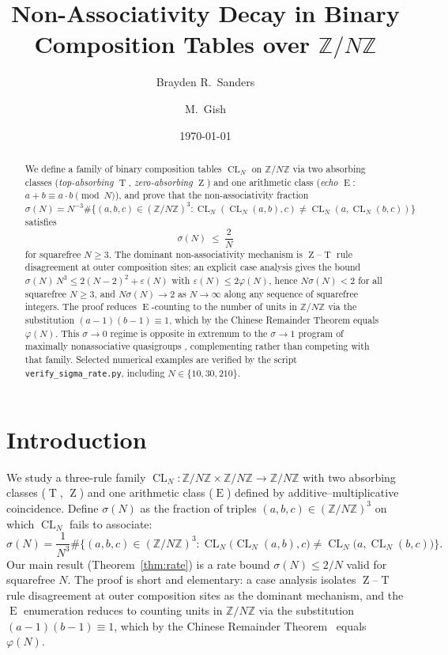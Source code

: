 \documentclass[11pt,reqno]{amsart}
\title[Non-associativity decay on \texorpdfstring{$\mathbb{Z}/N\mathbb{Z}$}{Z/NZ}]%
{Non-Associativity Decay in Binary Composition Tables over
$\mathbb{Z}/N\mathbb{Z}$}
\author{Brayden R.\ Sanders}
\author{M.\ Gish}
\date{\today}
\theoremstyle{plain}
\theoremstyle{definition}
\theoremstyle{remark}
\DeclareMathOperator{\CL}{CL}
\DeclareMathOperator{\ECHO}{E}
\DeclareMathOperator{\HARM}{T}
\DeclareMathOperator{\VOID}{Z}
\newcommand{\ZN}{\mathbb{Z}/N\mathbb{Z}}
\begin{document}
\begin{abstract}
We define a family of binary composition tables $\CL_N$ on $\ZN$ via
two absorbing classes (\emph{top-absorbing} $\HARM$, \emph{zero-absorbing}
$\VOID$) and one arithmetic class (\emph{echo} $\ECHO$: $a+b\equiv a\cdot b\pmod N$),
and prove that the non-associativity fraction
$\sigma(N)=N^{-3}\#\{(a,b,c)\in(\ZN)^{3}:\CL_N(\CL_N(a,b),c)\neq\CL_N(a,\CL_N(b,c))\}$
satisfies
\[
  \sigma(N)\;\le\;\frac{2}{N}
\]
for squarefree $N\ge 3$. The dominant non-associativity mechanism is
$\VOID$--$\HARM$ rule disagreement at outer composition sites; an
explicit case analysis gives the bound
$\sigma(N)\,N^{3}\le 2(N-2)^{2}+\varepsilon(N)$ with
$\varepsilon(N)\le 2\varphi(N)$, hence $N\sigma(N)<2$ for all
squarefree $N\ge 3$, and $N\sigma(N)\to 2$ as $N\to\infty$ along
any sequence of squarefree integers. The proof reduces $\ECHO$-counting to
the number of units in $\ZN$ via the substitution
$(a-1)(b-1)\equiv 1$, which by the Chinese Remainder Theorem equals
$\varphi(N)$. This $\sigma\to 0$ regime is opposite in extremum to
the $\sigma\to 1$ program of maximally nonassociative quasigroups
\cite{DrapalWanless2021,DrapalLisonek2020}, complementing rather than
competing with that family. Selected numerical examples
are verified by the script \texttt{verify\_sigma\_rate.py}, including
$N\in\{10,30,210\}$.
\end{abstract}

\maketitle

\section{Introduction}\label{sec:intro}

We study a three-rule family $\CL_N:\ZN\times\ZN\to\ZN$ with two
absorbing classes ($\HARM$, $\VOID$) and one arithmetic class
($\ECHO$) defined by additive--multiplicative coincidence. Define
$\sigma(N)$ as the fraction of triples $(a,b,c)\in(\ZN)^3$ on which
$\CL_N$ fails to associate:
\begin{equation}\label{eq:sigma-def}
  \sigma(N)=\frac{1}{N^{3}}
  \#\Big\{(a,b,c)\in(\ZN)^{3}:
         \CL_N\!\big(\CL_N(a,b),c\big)\neq\CL_N\!\big(a,\CL_N(b,c)\big)\Big\}.
\end{equation}
Our main result (Theorem~\ref{thm:rate}) is a rate bound
$\sigma(N)\le 2/N$ valid for squarefree $N$. The proof is short
and elementary: a case analysis isolates $\VOID$--$\HARM$ rule
disagreement at outer composition sites as the dominant mechanism,
and the $\ECHO$ enumeration reduces to counting units in $\ZN$
via the substitution $(a-1)(b-1)\equiv 1$, which by the Chinese
Remainder Theorem~\cite{Gauss1801,Lang2002} equals $\varphi(N)$.
\end{document}

